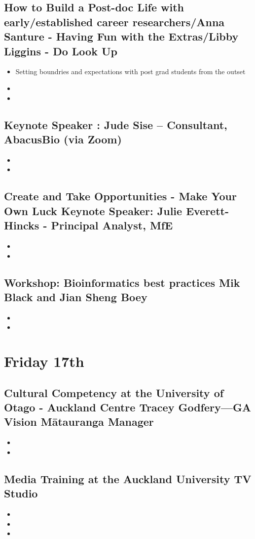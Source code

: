 \documentclass[document.tex]{subfiles}
\begin{document}
    \subsection{How to Build a Post-doc Life with early/established career researchers/Anna Santure - Having Fun with the Extras/Libby Liggins - Do Look Up}
    \begin{itemize}
    \item Setting boundries and expectations with post grad students from the outset
    \item 
    \item 
    \end{itemize}

    \subsection{Keynote Speaker : Jude Sise – Consultant, AbacusBio (via Zoom)}
    \begin{itemize}
    \item 
    \item 
    \end{itemize}

    \subsection{Create and Take Opportunities - Make Your Own Luck Keynote Speaker: Julie Everett-Hincks - Principal Analyst, MfE}
    \begin{itemize}
    \item 
    \item 
    \end{itemize}

    \subsection{Workshop: Bioinformatics best practices Mik Black and Jian Sheng Boey}
    \begin{itemize}
    \item 
    \item 
    \end{itemize}



\section*{Friday 17th}

    \subsection{Cultural Competency at the University of Otago - Auckland Centre Tracey Godfery—GA Vision Mātauranga Manager}
    \begin{itemize}
    \item 
    \item 
    \end{itemize}
    
    \subsection{Media Training at the Auckland University TV Studio}
    \begin{itemize}
    \item 
    \item 
    \item 
    \end{itemize}
    
    
\bib{}
    
\end{document}
